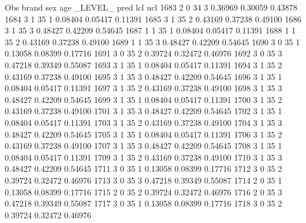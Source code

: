 \documentclass{article}
\begin{document}
\begin{Woutput}
 Obs    brand    sex    age    _LEVEL_      pred       lcl        ucl
1683      2       0      34       3       0.36969    0.30059    0.43878
1684      3       1      35       1       0.08404    0.05417    0.11391
1685      3       1      35       2       0.43169    0.37238    0.49100
1686      3       1      35       3       0.48427    0.42209    0.54645
1687      1       1      35       1       0.08404    0.05417    0.11391
1688      1       1      35       2       0.43169    0.37238    0.49100
1689      1       1      35       3       0.48427    0.42209    0.54645
1690      3       0      35       1       0.13058    0.08399    0.17716
1691      3       0      35       2       0.39724    0.32472    0.46976
1692      3       0      35       3       0.47218    0.39349    0.55087
1693      3       1      35       1       0.08404    0.05417    0.11391
1694      3       1      35       2       0.43169    0.37238    0.49100
1695      3       1      35       3       0.48427    0.42209    0.54645
1696      3       1      35       1       0.08404    0.05417    0.11391
1697      3       1      35       2       0.43169    0.37238    0.49100
1698      3       1      35       3       0.48427    0.42209    0.54645
1699      3       1      35       1       0.08404    0.05417    0.11391
1700      3       1      35       2       0.43169    0.37238    0.49100
1701      3       1      35       3       0.48427    0.42209    0.54645
1702      3       1      35       1       0.08404    0.05417    0.11391
1703      3       1      35       2       0.43169    0.37238    0.49100
1704      3       1      35       3       0.48427    0.42209    0.54645
1705      3       1      35       1       0.08404    0.05417    0.11391
1706      3       1      35       2       0.43169    0.37238    0.49100
1707      3       1      35       3       0.48427    0.42209    0.54645
1708      3       1      35       1       0.08404    0.05417    0.11391
1709      3       1      35       2       0.43169    0.37238    0.49100
1710      3       1      35       3       0.48427    0.42209    0.54645
1711      3       0      35       1       0.13058    0.08399    0.17716
1712      3       0      35       2       0.39724    0.32472    0.46976
1713      3       0      35       3       0.47218    0.39349    0.55087
1714      2       0      35       1       0.13058    0.08399    0.17716
1715      2       0      35       2       0.39724    0.32472    0.46976
1716      2       0      35       3       0.47218    0.39349    0.55087
1717      3       0      35       1       0.13058    0.08399    0.17716
1718      3       0      35       2       0.39724    0.32472    0.46976

\end{Woutput}
\end{document}
